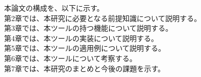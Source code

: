 本論文の構成を、以下に示す。\\
第2章では、本研究に必要となる前提知識について説明する。\\
第3章では、本ツールの持つ機能について説明する。\\
第4章では、本ツールの実装について説明する。\\
第5章では、本ツールの適用例について説明する。\\
第6章では、本ツールについて考察する。\\
第7章では、本研究のまとめと今後の課題を示す。
